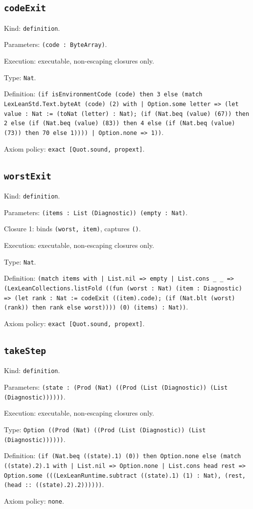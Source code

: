 \documentclass[11pt]{article}
\begin{document}
\subsection*{\texttt{codeExit}}
\noindent Kind: \texttt{definition}.\par
\noindent Parameters: \texttt{(code : ByteArray)}.\par
\noindent Execution: executable, non-escaping closures only.\par
\noindent Type: \texttt{Nat}.\par
\noindent Definition: \texttt{(if isEnvironmentCode (code) then 3 else (match LexLeanStd.Text.byteAt (code) (2) with | Option.some letter => (let value : Nat := (toNat (letter) : Nat); (if (Nat.beq (value) (67)) then 2 else (if (Nat.beq (value) (83)) then 4 else (if (Nat.beq (value) (73)) then 70 else 1)))) | Option.none => 1))}.\par
\noindent Axiom policy: \texttt{exact [Quot.sound, propext]}.\par
\subsection*{\texttt{worstExit}}
\noindent Kind: \texttt{definition}.\par
\noindent Parameters: \texttt{(items : List (Diagnostic)) (empty : Nat)}.\par
\noindent Closure 1: binds \texttt{(worst, item)}, captures \texttt{()}.\par
\noindent Execution: executable, non-escaping closures only.\par
\noindent Type: \texttt{Nat}.\par
\noindent Definition: \texttt{(match items with | List.nil => empty | List.cons \_ \_ => (LexLeanCollections.listFold ((fun (worst : Nat) (item : Diagnostic) => (let rank : Nat := codeExit ((item).code); (if (Nat.blt (worst) (rank)) then rank else worst)))) (0) (items) : Nat))}.\par
\noindent Axiom policy: \texttt{exact [Quot.sound, propext]}.\par
\subsection*{\texttt{takeStep}}
\noindent Kind: \texttt{definition}.\par
\noindent Parameters: \texttt{(state : (Prod (Nat) ((Prod (List (Diagnostic)) (List (Diagnostic))))))}.\par
\noindent Execution: executable, non-escaping closures only.\par
\noindent Type: \texttt{Option ((Prod (Nat) ((Prod (List (Diagnostic)) (List (Diagnostic))))))}.\par
\noindent Definition: \texttt{(if (Nat.beq ((state).1) (0)) then Option.none else (match ((state).2).1 with | List.nil => Option.none | List.cons head rest => Option.some (((LexLeanRuntime.subtract ((state).1) (1) : Nat), (rest, (head :: ((state).2).2))))))}.\par
\noindent Axiom policy: \texttt{none}.\par
\end{document}
